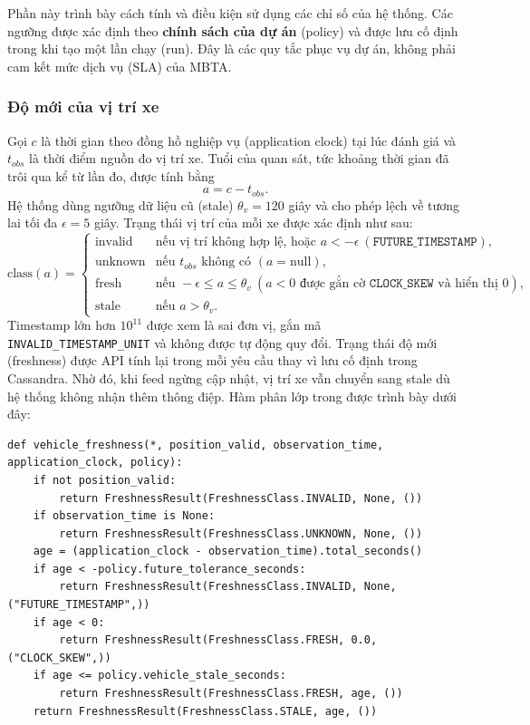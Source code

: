 Phần này trình bày cách tính và điều kiện sử dụng các chỉ số của hệ thống. Các ngưỡng được xác định theo \textbf{chính sách của dự án} (policy) và được lưu cố định trong  khi tạo một lần chạy (run). Đây là các quy tắc phục vụ dự án, không phải cam kết mức dịch vụ (SLA) của MBTA.

\subsubsection{Độ mới của vị trí xe}

Gọi $c$ là thời gian theo đồng hồ nghiệp vụ (application clock) tại lúc đánh giá và $t_{obs}$ là thời điểm nguồn đo vị trí xe. Tuổi của quan sát, tức khoảng thời gian đã trôi qua kể từ lần đo, được tính bằng
\begin{equation}
a = c - t_{obs}.
\end{equation}
Hệ thống dùng ngưỡng dữ liệu cũ (stale) $\theta_v = 120$ giây và cho phép lệch về tương lai tối đa $\epsilon = 5$ giây. Trạng thái vị trí của mỗi xe được xác định như sau:
\begin{equation}
\text{class}(a) =
\begin{cases}
\text{invalid} & \text{nếu vị trí không hợp lệ, hoặc } a < -\epsilon \ (\texttt{FUTURE\_TIMESTAMP}),\\
\text{unknown} & \text{nếu } t_{obs} \text{ không có } (a = \text{null}),\\
\text{fresh} & \text{nếu } -\epsilon \le a \le \theta_v \ (a<0 \text{ được gắn cờ } \texttt{CLOCK\_SKEW} \text{ và hiển thị } 0),\\
\text{stale} & \text{nếu } a > \theta_v.
\end{cases}
\end{equation}
Timestamp lớn hơn $10^{11}$ được xem là sai đơn vị, gắn mã \texttt{INVALID\_TIMESTAMP\_UNIT} và không được tự động quy đổi. Trạng thái độ mới (freshness) được API tính lại trong mỗi yêu cầu thay vì lưu cố định trong Cassandra. Nhờ đó, khi feed ngừng cập nhật, vị trí xe vẫn chuyển sang stale dù hệ thống không nhận thêm thông điệp. Hàm phân lớp trong  được trình bày dưới đây:

\begin{verbatim}
def vehicle_freshness(*, position_valid, observation_time, application_clock, policy):
    if not position_valid:
        return FreshnessResult(FreshnessClass.INVALID, None, ())
    if observation_time is None:
        return FreshnessResult(FreshnessClass.UNKNOWN, None, ())
    age = (application_clock - observation_time).total_seconds()
    if age < -policy.future_tolerance_seconds:
        return FreshnessResult(FreshnessClass.INVALID, None, ("FUTURE_TIMESTAMP",))
    if age < 0:
        return FreshnessResult(FreshnessClass.FRESH, 0.0, ("CLOCK_SKEW",))
    if age <= policy.vehicle_stale_seconds:
        return FreshnessResult(FreshnessClass.FRESH, age, ())
    return FreshnessResult(FreshnessClass.STALE, age, ())
\end{verbatim}

